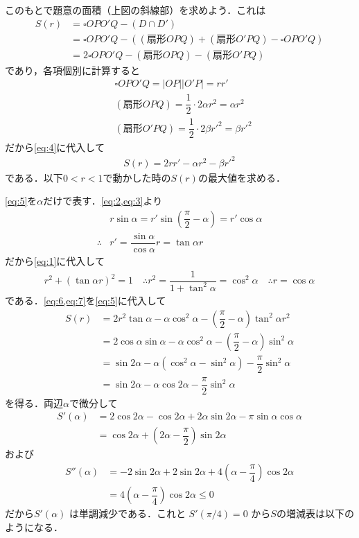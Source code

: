 \documentclass[../../main.tex]{subfiles}
\begin{document}
このもとで題意の面積（上図の斜線部）を求めよう．これは
\begin{align}
  S(r)
  & = \square OPO'Q - (D \cap D') \\
  & = \square OPO'Q - \left((\text{扇形}OPQ)+(\text{扇形}O'PQ)- \square OPO'Q\right) \\
  & = 2\square OPO'Q - (\text{扇形}OPQ) - (\text{扇形}O'PQ) \label{eq:4}
\end{align}
であり，各項個別に計算すると
\begin{align}
  & \square OP O' Q = |OP||O'P| = rr' \\
  & (\text{扇形}OPQ) = \dfrac{1}{2}\cdot 2\alpha r^2 = \alpha r^2 \\
  & (\text{扇形}O'PQ) = \dfrac{1}{2}\cdot 2\beta r'^2 = \beta r'^2
\end{align}
だから\cref{eq:4}に代入して
\begin{align}
  S(r) = 2rr' - \alpha r^2 - \beta r'^2 \label{eq:5}
\end{align}
である．以下$0<r<1$で動かした時の$S(r)$の最大値を求める．

\cref{eq:5}を$\alpha$だけで表す．\cref{eq:2,eq:3}より
\begin{align}
  & r\sin\alpha = r' \sin\left(\dfrac{\pi}{2}-\alpha\right) = r'\cos\alpha \\
  \therefore
  & r' = \dfrac{\sin\alpha}{\cos\alpha}r = \tan\alpha r \label{eq:6}
\end{align}
だから\cref{eq:1}に代入して
\begin{align}
  r^2 + (\tan\alpha r)^2 = 1
  \quad \therefore
  r^2 = \dfrac{1}{1+\tan^2\alpha} = \cos^2\alpha
  \quad \therefore
  r = \cos \alpha \label{eq:7}
\end{align}
である．\cref{eq:6,eq:7}を\cref{eq:5}に代入して
\begin{align}
  S(r)
  & = 2r^2\tan\alpha - \alpha \cos^2\alpha - \left(\dfrac{\pi}{2}-\alpha\right)\tan^2\alpha r^2 \\
  & = 2\cos\alpha\sin\alpha - \alpha\cos^2\alpha - \left(\dfrac{\pi}{2}-\alpha\right)\sin^2\alpha \\
  & = \sin 2\alpha - \alpha(\cos^2\alpha-\sin^2\alpha) - \dfrac{\pi}{2}\sin^2\alpha \\
  & = \sin 2\alpha - \alpha\cos 2\alpha - \dfrac{\pi}{2}\sin^2\alpha \label{eq:8}
\end{align}
を得る．両辺$\alpha$で微分して
\begin{align}
  S'(\alpha)
  & = 2\cos 2\alpha - \cos 2\alpha + 2\alpha\sin 2\alpha - \pi \sin\alpha\cos\alpha \\
  & = \cos 2\alpha + \left(2\alpha- \dfrac{\pi}{2}\right)\sin 2\alpha \label{eq:9}
\end{align}
および
\begin{align}
  S''(\alpha)
  &= -2 \sin 2\alpha + 2 \sin 2\alpha + 4(\alpha - \dfrac{\pi}{4}) \cos 2\alpha \\
  &= 4(\alpha - \dfrac{\pi}{4}) \cos 2\alpha \le 0
\end{align}
だから$S'(\alpha)$ は単調減少である．これと $S'(\pi/4) = 0$ から$S$の増減表は以下のようになる．
\end{document}
